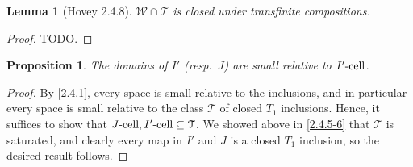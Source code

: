 \documentclass{amsart}
\theoremstyle{plain}
\newtheorem{proposition}[theorem]{Proposition}
\newtheorem{lemma}[theorem]{Lemma}
\theoremstyle{definition}
\newcommand{\sseq}{\subseteq}
\newcommand{\0}{\mathbf{0}}
\newcommand{\cT}{\mathcal T}
\newcommand{\cW}{\mathcal W}
\renewcommand{\(}{\left(}
\renewcommand{\)}{\right)}
\newcommand{\cell}{\text-\mathrm{cell}}
\begin{document}
\begin{lemma}[Hovey 2.4.8]\label{2.4.8}
  $\cW\cap\cT$ is closed under transfinite compositions.
\end{lemma}
\begin{proof}
  \color{red}TODO.
\end{proof}

\begin{proposition}\label{domains_of_I'/J_small_rel_I'-cell/J-cell}
  The domains of $I'$ (resp.\ $J$) are small relative to $I'\cell$.
\end{proposition}
\begin{proof}
  By \autoref{2.4.1}, every space is small relative to the inclusions, and in particular every space is small relative to the class $\cT$ of closed $T_1$ inclusions. Hence, it suffices to show that $J\cell,I'\cell\sseq\cT$. We showed above in \autoref{2.4.5-6} that $\cT$ is saturated, and clearly every map in $I'$ and $J$ is a closed $T_1$ inclusion, so the desired result follows.
\end{proof}
\end{document}
